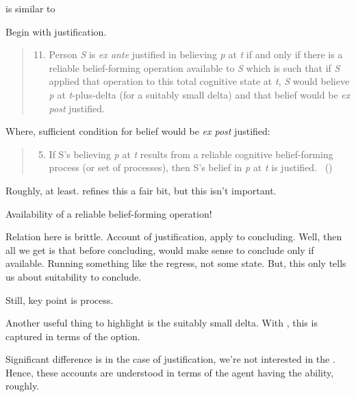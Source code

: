 \begin{note}
  \citeauthor{Turri:2010aa} is similar to \citeauthor{Goldman:1979ui}

  Begin with justification.

  \begin{quote}
    \begin{enumerate}[label=(\arabic*)]
      \setcounter{enumi}{10}
    \item
      Person \emph{S} is \emph{ex ante} justified in believing \emph{p} at \emph{t} if and only if there is a reliable belief-forming operation available to \emph{S} which is such that if \emph{S} applied that operation to this total cognitive state at \emph{t}, \emph{S} would believe \emph{p} at \emph{t}-plus-delta (for a suitably small delta) and that belief would be \emph{ex post} justified.
    \end{enumerate}
  \end{quote}

  Where, sufficient condition for belief would be \emph{ex post} justified:
  \begin{quote}
    \begin{enumerate}[label=(\arabic*)]
      \setcounter{enumi}{4}
    \item
      If S's believing \emph{p} at \emph{t} results from a reliable cognitive belief-forming process (or set of processes), then S's belief in \emph{p} at \emph{t} is justified.%
      \mbox{ }\hfill\mbox{(\citeyear[13]{Goldman:1979ui})}
    \end{enumerate}
  \end{quote}
  Roughly, at least.
  \citeauthor{Goldman:1979ui} refines this a fair bit, but this isn't important.

  Availability of a reliable belief-forming operation!

  Relation here is brittle.
  Account of justification, apply to concluding.
  Well, then all we get is that before concluding, would make sense to conclude only if available.
  Running something like the \citeauthor{Carroll:1895uj} regress, not some state.
  But, this only tells us about suitability to conclude.

  Still, key point is process.

  Another useful thing to highlight is the suitably small delta.
  With \requ{}, this is captured in terms of the option.
\end{note}

\begin{note}
  Significant difference is in the case of justification, we're not interested in the \agpe{}.
  Hence, these accounts are understood in terms of the agent having the ability, roughly.
\end{note}


